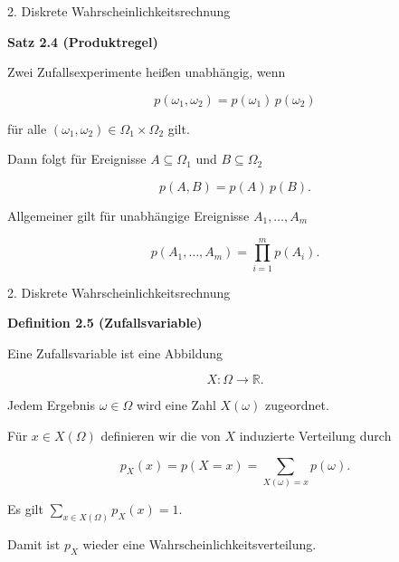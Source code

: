\documentclass{beamer}
\begin{document}
\begin{frame}{2. Diskrete Wahrscheinlichkeitsrechnung}

\textbf{Satz 2.4 (Produktregel)}

\vspace{0.3cm}

Zwei Zufallsexperimente heißen unabhängig, wenn

\[
p(\omega_1,\omega_2)
=
p(\omega_1)\,p(\omega_2)
\]

für alle \((\omega_1,\omega_2)\in\Omega_1\times\Omega_2\) gilt.

\vspace{0.3cm}

Dann folgt für Ereignisse \(A\subseteq\Omega_1\) und
\(B\subseteq\Omega_2\)

\[
p(A,B)=p(A)\,p(B).
\]

\vspace{0.4cm}

Allgemeiner gilt für unabhängige Ereignisse
\(A_1,\ldots,A_m\)

\[
p(A_1,\ldots,A_m)
=
\prod_{i=1}^{m} p(A_i).
\]

\end{frame}

\begin{frame}{2. Diskrete Wahrscheinlichkeitsrechnung}

\textbf{Definition 2.5 (Zufallsvariable)}

\vspace{0.3cm}

Eine Zufallsvariable ist eine Abbildung

\[
X:\Omega\rightarrow\mathbb{R}.
\]

Jedem Ergebnis \(\omega\in\Omega\) wird eine Zahl
\(X(\omega)\) zugeordnet.

\vspace{0.3cm}

Für \(x\in X(\Omega)\) definieren wir die von \(X\)
induzierte Verteilung durch

\[
p_X(x)
=
p(X=x)
=
\sum_{X(\omega)=x} p(\omega).
\]

\vspace{0.3cm}

Es gilt \(\sum_{x\in X(\Omega)} p_X(x)=1.\)

Damit ist \(p_X\) wieder eine Wahrscheinlichkeitsverteilung.

\end{frame}
\end{document}
